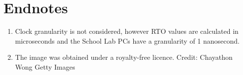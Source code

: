 \section{Endnotes}

\begin{enumerate}
    \item Clock granularity is not considered, however RTO values are calculated in microseconds and the School Lab PCs have a granularity of 1 nanosecond.
    \item The image was obtained under a royalty-free licence. Credit: Chayathon Wong Getty Images
\end{enumerate}